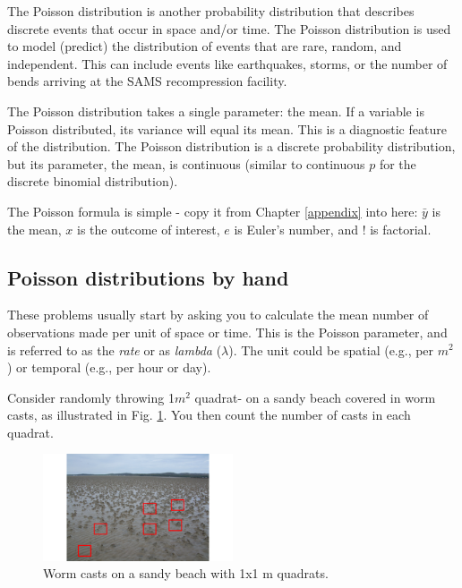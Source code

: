\documentclass[
  11pt,
  a4paper,
]{book}
\begin{document}
The Poisson distribution is another probability distribution that describes discrete events that occur in space and/or time. The Poisson distribution is used to model (predict) the distribution of events that are rare, random, and independent. This can include events like earthquakes, storms, or the number of bends arriving at the SAMS recompression facility.

The Poisson distribution takes a single parameter: the mean. If a variable is Poisson distributed, its variance will equal its mean. This is a diagnostic feature of the distribution. The Poisson distribution is a discrete probability distribution, but its parameter, the mean, is continuous (similar to continuous \(p\) for the discrete binomial distribution).

The Poisson formula is simple - copy it from Chapter \ref{appendix} into here:
\newline
\newline
\newline
\newline
\newline
\newline
\newline
\(\bar{y}\) is the mean, \(x\) is the outcome of interest, \(e\) is Euler's number, and \(!\) is factorial.

\hypertarget{poisson-distributions-by-hand}{%
\subsection{Poisson distributions by hand}\label{poisson-distributions-by-hand}}

These problems usually start by asking you to calculate the mean number of observations made per unit of space or time. This is the Poisson parameter, and is referred to as the \emph{rate} or as \emph{lambda} (\(\lambda\)). The unit could be spatial (e.g., per \(m^2\)) or temporal (e.g., per hour or day).

Consider randomly throwing 1\(m^2\) quadrat- on a sandy beach covered in worm casts, as illustrated in Fig. \ref{fig:worm-casts}. You then count the number of casts in each quadrat.

\begin{figure}
\centerline{\includegraphics[width=0.5\textwidth]{figs/worm_casts.png}}
\caption{Worm casts on a sandy beach with 1x1 m quadrats.}
\label{fig:worm-casts}
\end{figure}
\end{document}
